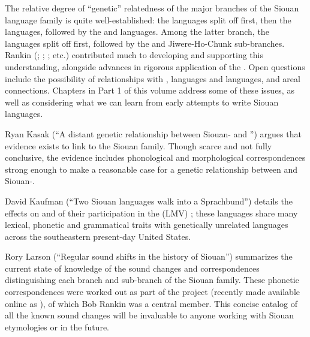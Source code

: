 \begin{refsection}

The relative degree of ``genetic'' relatedness of the major branches of the Siouan language family is quite well-established: the  languages split off first, then the  languages, followed by the  and  languages. Among the latter branch, the  languages split off first, followed by the  and Jiwere-Ho-Chunk sub-branches. Rankin (\citeyear{Rankin1988}; \citeyear{Rankin1998macrosiouan}; \citealt{RankinEtAl1998}; etc.) contributed much to developing and supporting this understanding, alongside advances in rigorous application of the . Open questions include the possibility of relationships with ,  languages and  languages, and areal connections. Chapters in Part 1 of this volume address some of these issues, as well as considering what we can learn from early attempts to write Siouan languages.

Ryan Kasak (``A distant genetic relationship between Siouan- and '') argues that evidence exists to link  to the Siouan family. Though scarce and not fully conclusive, the evidence includes phonological and morphological correspondences strong enough to make a reasonable case for a genetic relationship between  and Siouan-. 

David Kaufman (``Two Siouan languages walk into a Sprachbund'') details the effects on  and  of their participation in the  (LMV) ; these languages share many lexical, phonetic and grammatical traits with genetically unrelated languages across the southeastern present-day United States. 

Rory Larson (``Regular sound shifts in the history of Siouan'') summarizes the current state of knowledge of the sound changes and correspondences distinguishing each branch and sub-branch of the Siouan family. These phonetic correspondences were worked out as part of the  project (recently made available online as \citet{Rankinetal2015AccessSeptember}), of which Bob Rankin was a central member. This concise catalog of all the known sound changes will be invaluable to anyone working with Siouan etymologies or  in the future.


\end{refsection}
